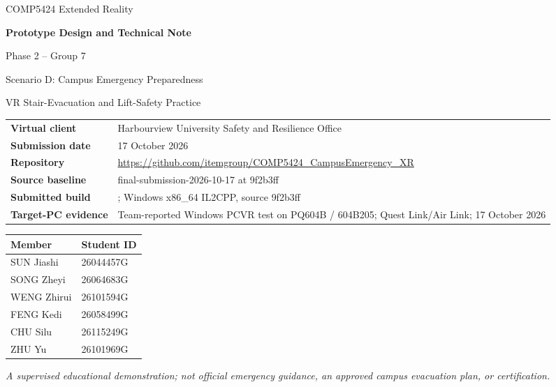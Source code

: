 \documentclass[12pt,a4paper]{article}
\newcommand{\code}[1]{\textnormal{#1}}
\newcommand{\repo}{https://github.com/itemgroup/COMP5424_CampusEmergency_XR}
\begin{document}
\begin{titlepage}
\centering
\vspace*{1.1cm}
{\Large COMP5424 Extended Reality\par}
\vspace{0.8cm}
{\LARGE\bfseries Prototype Design and Technical Note\par}
\vspace{0.5cm}
{\Large Phase 2 -- Group 7\par}
\vspace{0.8cm}
{\large Scenario D: Campus Emergency Preparedness\par}
\vspace{0.3cm}
{\large VR Stair-Evacuation and Lift-Safety Practice\par}
\vspace{0.8cm}
\begin{tabularx}{\textwidth}{@{}lY@{}}
\textbf{Virtual client} & Harbourview University Safety and Resilience Office \\
\textbf{Submission date} & 17 October 2026 \\
\textbf{Repository} & \url{\repo} \\
\textbf{Source baseline} & \code{final-submission-2026-10-17} at \code{9f2b3ff} \\
\textbf{Submitted build} & ; Windows x86\_64 IL2CPP, source \code{9f2b3ff} \\
\textbf{Target-PC evidence} & Team-reported Windows PCVR test on PQ604B / 604B205; Quest Link/Air Link; 17 October 2026 \\
\end{tabularx}
\vspace{0.8cm}
\begin{tabularx}{0.75\textwidth}{@{}YY@{}}
\toprule
\textbf{Member} & \textbf{Student ID} \\
\midrule
SUN Jiashi & 26044457G \\
SONG Zheyi & 26064683G \\
WENG Zhirui & 26101594G \\
FENG Kedi & 26058499G \\
CHU Silu & 26115249G \\
ZHU Yu & 26101969G \\
\bottomrule
\end{tabularx}
\vfill
\textit{A supervised educational demonstration; not official emergency guidance,
an approved campus evacuation plan, or certification.}
\end{titlepage}
\end{document}

